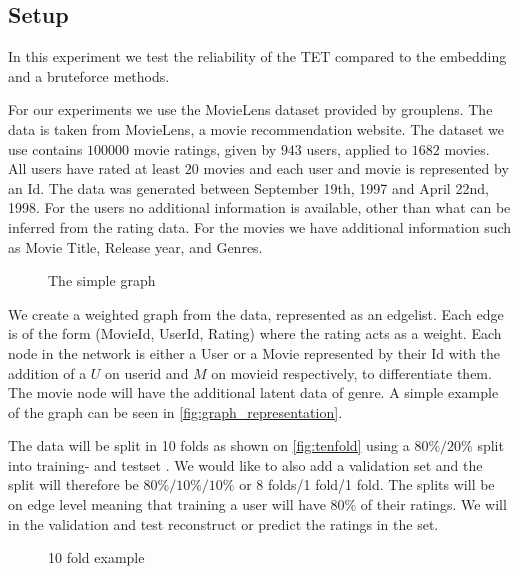 \subsection{Setup}\label{Subsec:setup}
In this experiment we test the reliability of the TET compared to the embedding and a bruteforce methods. 

For our experiments we use the MovieLens dataset provided by grouplens\cite{Grouplensdata}. The data is taken from MovieLens, a movie recommendation website. The dataset we use contains $100000$ movie ratings, given by $943$ users, applied to $1682$ movies. All users have rated at least $20$ movies and each user and movie is represented by an Id. The data was generated between September 19th, 1997 and April 22nd, 1998. For the users no additional information is available, other than what can be inferred from the rating data. For the movies we have additional information such as Movie Title, Release year, and Genres.

\begin{figure}[H]
	\centering
	\begin{adjustbox}{width=0.5\textwidth}
		
	\end{adjustbox}
	\caption{The simple graph}
	\label{fig:graph_representation}
\end{figure}

We create a weighted graph from the data, represented as an edgelist. Each edge is of the form (MovieId, UserId, Rating) where the rating acts as a weight. Each node in the network is either a User or a Movie represented by their Id with the addition of a $U$ on userid and $M$ on movieid respectively, to differentiate them. The movie node will have the additional latent data of genre. A simple example of the graph can be seen in \autoref{fig:graph_representation}.

The data will be split in 10 folds as shown on \autoref{fig:tenfold} using a $80\%/20\%$ split into training- and testset \cite{Ricci2015}. We would like to also add a validation set and the split will therefore be $80\%/10\%/10\%$ or 8 folds/1 fold/1 fold. The splits will be on edge level meaning that training a user will have $80\%$ of their ratings. We will in the validation and test reconstruct or predict the ratings in the set.

\begin{figure}[H]
	\centering
	\begin{adjustbox}{width=0.5\textwidth}
		
	\end{adjustbox}
	\caption{10 fold example}
	\label{fig:tenfold}
\end{figure}


